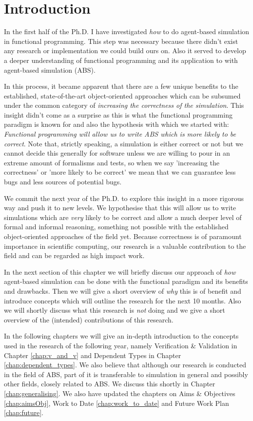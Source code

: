 \chapter{Introduction}
\label{chap:intro}
In the first half of the Ph.D. I have investigated \textit{how} to do agent-based simulation in functional programming. This step was necessary because there didn't exist any research or implementation we could build ours on. Also it served to develop a deeper understanding of functional programming and its application to with agent-based simulation (ABS).

In this process, it became apparent that there are a few unique benefits to the established, state-of-the-art object-oriented approaches which can be subsumed under the common category of \textit{increasing the correctness of the simulation}. This insight didn't come as a surprise as this is what the functional programming paradigm is known for and also the hypothesis with which we started with: \textit{Functional programming will allow us to write ABS which is more likely to be correct}. Note that, strictly speaking, a simulation is either correct or not but we cannot decide this generally for software unless we are willing to pour in an extreme amount of formalisms and tests, so when we say 'increasing the correctness' or 'more likely to be correct' we mean that we can guarantee less bugs and less sources of potential bugs.

We commit the next year of the Ph.D. to explore this insight in a more rigorous way and push it to new levels. We hypothesise that this will allow us to write simulations which are \textit{very} likely to be correct and allow a much deeper level of formal and informal reasoning, something not possible with the established object-oriented approaches of the field yet. Because correctness is of paramount importance in scientific computing, our research is a valuable contribution to the field and can be regarded as high impact work.

In the next section of this chapter we will briefly discuss our approach of \textit{how} agent-based simulation can be done with the functional paradigm and its benefits and drawbacks. Then we will give a short overview of \textit{why} this is of benefit and introduce concepts which will outline the research for the next 10 months. Also we will shortly discuss what this research is \textit{not} doing and we give a short overview of the (intended) contributions of this research. 

In the following chapters we will give an in-depth introduction to the concepts used in the research of the following year, namely Verification \& Validation in Chapter \ref{chap:v_and_v} and Dependent Types in Chapter \ref{chap:dependent_types}. We also believe that although our research is conducted in the field of ABS, part of it is transferable to simulation in general and possibly other fields, closely related to ABS. We discuss this shortly in Chapter \ref{chap:generalising}. We also have updated the chapters on Aims \& Objectives \ref{chap:aimsObj}, Work to Date \ref{chap:work_to_date} and Future Work Plan \ref{chap:future}.

